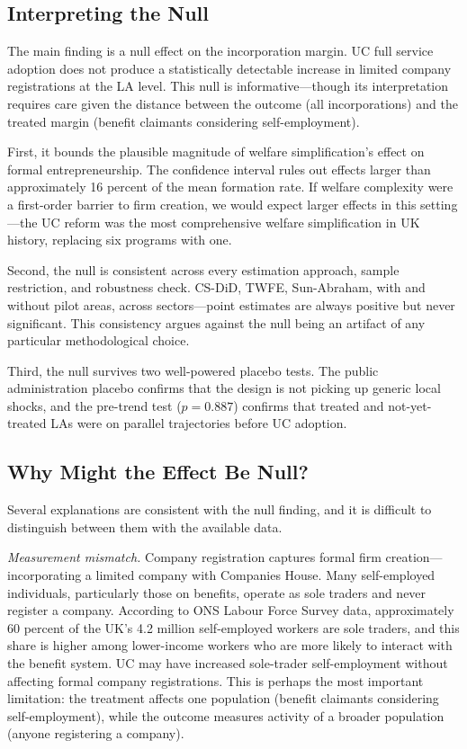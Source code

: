 \documentclass[12pt]{article}
\begin{document}
\subsection{Interpreting the Null}

The main finding is a null effect on the incorporation margin. UC full service adoption does not produce a statistically detectable increase in limited company registrations at the LA level. This null is informative---though its interpretation requires care given the distance between the outcome (all incorporations) and the treated margin (benefit claimants considering self-employment).

First, it bounds the plausible magnitude of welfare simplification's effect on formal entrepreneurship. The confidence interval rules out effects larger than approximately 16 percent of the mean formation rate. If welfare complexity were a first-order barrier to firm creation, we would expect larger effects in this setting---the UC reform was the most comprehensive welfare simplification in UK history, replacing six programs with one.

Second, the null is consistent across every estimation approach, sample restriction, and robustness check. CS-DiD, TWFE, Sun-Abraham, with and without pilot areas, across sectors---point estimates are always positive but never significant. This consistency argues against the null being an artifact of any particular methodological choice.

Third, the null survives two well-powered placebo tests. The public administration placebo confirms that the design is not picking up generic local shocks, and the pre-trend test ($p = 0.887$) confirms that treated and not-yet-treated LAs were on parallel trajectories before UC adoption.

\subsection{Why Might the Effect Be Null?}

Several explanations are consistent with the null finding, and it is difficult to distinguish between them with the available data.

\textit{Measurement mismatch.} Company registration captures formal firm creation---incorporating a limited company with Companies House. Many self-employed individuals, particularly those on benefits, operate as sole traders and never register a company. According to ONS Labour Force Survey data, approximately 60 percent of the UK's 4.2 million self-employed workers are sole traders, and this share is higher among lower-income workers who are more likely to interact with the benefit system. UC may have increased sole-trader self-employment without affecting formal company registrations. This is perhaps the most important limitation: the treatment affects one population (benefit claimants considering self-employment), while the outcome measures activity of a broader population (anyone registering a company).
\end{document}
